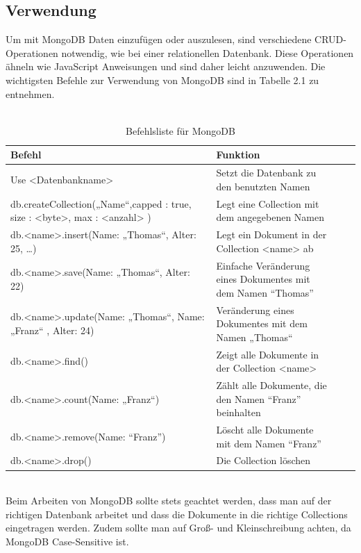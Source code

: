 \subsection{Verwendung}
Um mit MongoDB Daten einzufügen oder auszulesen, sind verschiedene CRUD-Operationen notwendig, wie bei einer relationellen Datenbank. Diese Operationen ähneln wie JavaScript Anweisungen und sind daher leicht anzuwenden. Die wichtigsten Befehle zur Verwendung von MongoDB sind in Tabelle 2.1 zu entnehmen.
\\
\\
\begin{table}[h]
\centering
\begin{tabular}{p{7cm}|p{7cm}|c|c|}
\hline 
Befehl & Funktion \\ 
\hline 
Use <Datenbankname> & Setzt die Datenbank zu den benutzten Namen \\ 
\hline 
db.createCollection(„Name“,{capped : true, size : <byte>, max : <anzahl> }) & Legt eine Collection mit dem angegebenen Namen \\ 
\hline 
db.<name>.insert({Name: „Thomas“, Alter: 25, …})  & Legt ein Dokument in der Collection <name> ab \\ 
\hline 
db.<name>.save({Name: „Thomas“, Alter: 22}) & Einfache Veränderung eines Dokumentes mit dem Namen “Thomas” \\ 
\hline 
db.<name>.update({Name: „Thomas“}, {Name: „Franz“ , Alter: 24}) & Veränderung eines Dokumentes mit dem Namen „Thomas“ \\ 
\hline 
db.<name>.find() & Zeigt alle Dokumente in der Collection <name> \\ 
\hline 
db.<name>.count({Name: „Franz“}) & Zählt alle Dokumente, die den Namen “Franz” beinhalten \\ 
\hline 
db.<name>.remove({Name: “Franz”}) & Löscht alle Dokumente mit dem Namen “Franz” \\ 
\hline 
db.<name>.drop() & Die Collection löschen \\ 
\hline 
\end{tabular}
\caption{Befehlsliste für MongoDB}
\end{table} 
\\
Beim Arbeiten von MongoDB sollte stets geachtet werden, dass man auf der richtigen Datenbank arbeitet und dass die Dokumente in die richtige Collections eingetragen werden. Zudem sollte man auf Groß-  und Kleinschreibung achten, da MongoDB Case-Sensitive ist. 

